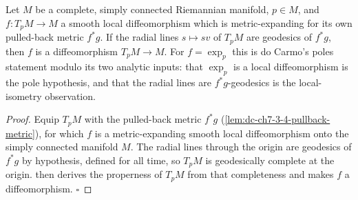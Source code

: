 \begin{lemma}
  \label{lem:dc-ch7-3-4-pole-diffeo}
  \leanok
  Let $M$ be a complete, simply connected Riemannian manifold, $p\in M$, and $f:T_pM\to M$
  a smooth local diffeomorphism which is metric-expanding for its own pulled-back metric
  $f^*g$. If the radial lines $s\mapsto sv$ of $T_pM$ are geodesics of $f^*g$, then $f$ is a
  diffeomorphism $T_pM\to M$. For $f=\exp_p$ this is do Carmo's poles statement modulo its
  two analytic inputs: that $\exp_p$ is a local diffeomorphism is the pole hypothesis, and
  that the radial lines are $f^*g$-geodesics is the local-isometry observation.
\end{lemma}
\begin{proof}
  \leanok
  Equip $T_pM$ with the pulled-back metric $f^*g$
  (\cref{lem:dc-ch7-3-4-pullback-metric}), for which $f$ is a metric-expanding smooth local
  diffeomorphism onto the simply connected manifold $M$. The radial lines through the origin
  are geodesics of $f^*g$ by hypothesis, defined for all time, so $T_pM$ is geodesically
  complete at the origin.  then derives the properness of
  $T_pM$ from that completeness and makes $f$ a diffeomorphism. $\square$
\end{proof}

